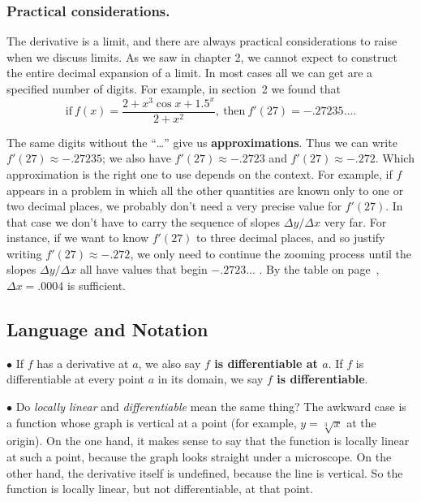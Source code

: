 \subsubsection{Practical considerations.}
The derivative is a limit, and there
are always practical considerations to raise when we discuss limits.
As we saw in chapter 2, we cannot expect to construct the entire
decimal expansion of a limit.  In most cases all we can get are a
specified number of digits.  For example, in section~2 we found that
\[
\mbox{if} \ f(x) = 
		\dfrac{2 + x^3\cos{x} + 1.5^x}{2 + x^2}, \ 
		\mbox{then} \ f'(27) = -.27235\ldots .
\]

The same digits without the ``\ldots'' give us {\bf
  approximations}. Thus we can write $f'(27)
\approx -.27235$; we also have $f'(27) \approx -.2723$ and $f'(27)
\approx -.272$.  Which approximation is the right one to use depends
on the context.  For example, if $f$ appears in a problem in which all
the other quantities are known only to one or two decimal places, we
probably don't need a very precise value for $f'(27)$.  In that case
we don't have to carry the sequence of slopes $\Delta y/\Delta x$ very
far.  For instance, if we want to know $f'(27)$ to three decimal
places, and so justify writing $f'(27) \approx -.272$, we only need to
continue the zooming process until the slopes $\Delta y/\Delta x$ all
have values that begin $-.2723\ldots$ .  By the table on
page~\pageref{`zoom'}, $\Delta x = .0004$ is sufficient.


\subsection{Language and Notation}  
\label{subsec:language-and-notation}

\noindent$\bullet$ If $f$ has a derivative at $a$, we also say {\bf \boldmath
  $f$ is differentiable at $a$}.  If $f$ is differentiable at every
point $a$ in its domain, we say {\bf \boldmath $f$ is
  differentiable}.

\noindent$\bullet$ Do {\em locally linear\/} and {\em differentiable\/} mean
the same thing?  The awkward case is a function whose graph is
vertical at a point (for example, $y = \sqrt[3]{x}$ at the origin).
On the one hand, it makes sense to say that the function is locally
linear at such a point, because the graph looks straight under a
microscope.  On the other hand, the derivative itself is undefined,
because the line is vertical.  So the function is locally linear, but
not differentiable, at that point.

